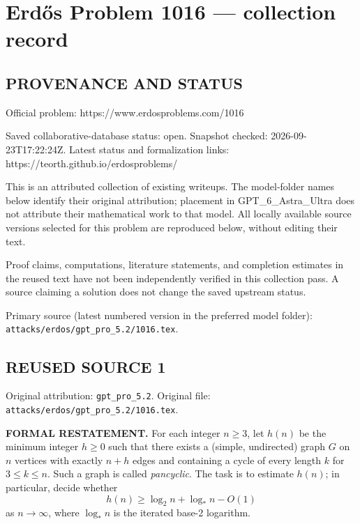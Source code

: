 \section*{Erd\H{o}s Problem 1016 --- collection record}

\subsection*{PROVENANCE AND STATUS}
Official problem: https://www.erdosproblems.com/1016

Saved collaborative-database status: open.
Snapshot checked: 2026-09-23T17:22:24Z.
Latest status and formalization links: https://teorth.github.io/erdosproblems/

This is an attributed collection of existing writeups. The model-folder names below identify their original attribution; placement in GPT\_6\_Astra\_Ultra does not attribute their mathematical work to that model. All locally available source versions selected for this problem are reproduced below, without editing their text.

Proof claims, computations, literature statements, and completion estimates in the reused text have not been independently verified in this collection pass. A source claiming a solution does not change the saved upstream status.

Primary source (latest numbered version in the preferred model folder): \texttt{attacks/erdos/gpt\_pro\_5.2/1016.tex}.

\subsection*{REUSED SOURCE 1}
Original attribution: \texttt{gpt\_pro\_5.2}.
Original file: \texttt{attacks/erdos/gpt\_pro\_5.2/1016.tex}.


\noindent\textbf{FORMAL RESTATEMENT.}
For each integer $n\ge 3$, let $h(n)$ be the minimum integer $h\ge 0$ such that there exists a (simple, undirected) graph $G$ on $n$ vertices with exactly $n+h$ edges and containing a cycle of every length $k$ for $3\le k\le n$. Such a graph is called \emph{pancyclic}. The task is to estimate $h(n)$; in particular, decide whether
\[
h(n)\ge \log_2 n + \log_* n - O(1)
\]
as $n\to\infty$, where $\log_* n$ is the iterated base-2 logarithm.

